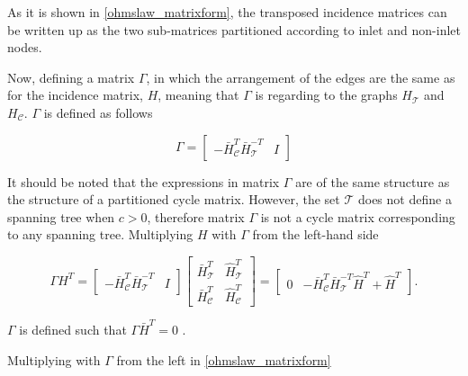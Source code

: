 As it is shown in \eqref{ohmslaw_matrixform}, the transposed incidence matrices can be written up as the two sub-matrices partitioned according to inlet and non-inlet nodes. 

Now, defining a matrix $\Gamma$, in which the arrangement of the edges are the same as for the incidence matrix, $H$, meaning that $\Gamma$ is regarding to the graphs $H_{\mathcal{T}}$ and $H_{\mathcal{C}}$. $\Gamma$ is defined as follows

\begin{equation}
\label{bmatrix}
\Gamma
 =
\begin{bmatrix} 
-\bar{H}^T_{\mathcal{C}}\bar{H}^{-T}_{\mathcal{T}} & I 
\end{bmatrix}
\end{equation}

It should be noted that the expressions in matrix $\Gamma$ are of the same structure as the structure of a partitioned cycle matrix. However, the set $\mathcal{T}$ does not define a spanning tree when $c>0$, therefore matrix $\Gamma$ is not a cycle matrix corresponding to any spanning tree. Multiplying $H$ with $\Gamma$ from the left-hand side

 \begin{equation}
  \label{meshlaw_analogy}
  \Gamma H^T = 
  \begin{bmatrix} 
-\bar{H}^T_{\mathcal{C}}\bar{H}^{-T}_{\mathcal{T}} & I 
\end{bmatrix}
\begin{bmatrix}
   \bar{H}^T_{\mathcal{T}} & \hat{H}^T_{\mathcal{T}} \\[3pt]
   \bar{H}^T_{\mathcal{C}} & \hat{H}^T_{\mathcal{C}} 
   \end{bmatrix} 
   =
   \begin{bmatrix} 
0 & -\bar{H}^T_{\mathcal{C}}\bar{H}^{-T}_{\mathcal{T}}\hat{H}^T + \hat{H}^T 
\end{bmatrix}
.
\end{equation}

$\Gamma$ is defined such that $\Gamma \bar{H}^T = 0$ \cite{deo2017graph}. 

Multiplying with $\Gamma$ from the left in \eqref{ohmslaw_matrixform} 

